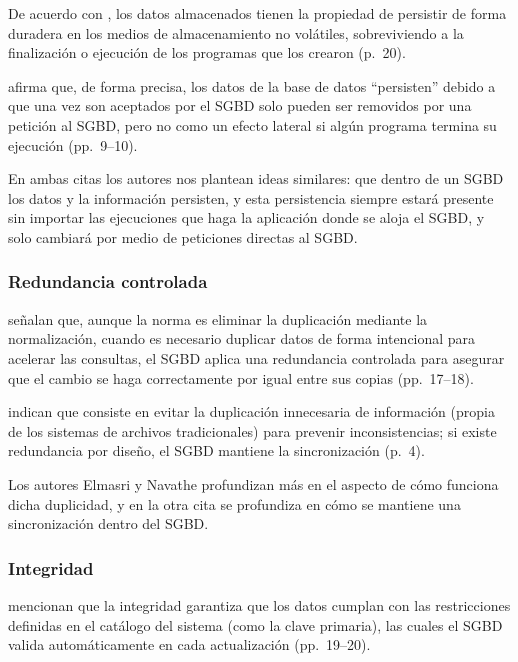 De acuerdo con \textcite{elmasri_navathe}, los datos almacenados tienen la propiedad de persistir de forma duradera en los medios de almacenamiento no volátiles, sobreviviendo a la finalización o ejecución de los programas que los crearon (p.~20).

\textcite{date_intro_bd} afirma que, de forma precisa, los datos de la base de datos \enquote{persisten} debido a que una vez son aceptados por el SGBD solo pueden ser removidos por una petición al SGBD, pero no como un efecto lateral si algún programa termina su ejecución (pp.~9--10).

En ambas citas los autores nos plantean ideas similares: que dentro de un SGBD los datos y la información persisten, y esta persistencia siempre estará presente sin importar las ejecuciones que haga la aplicación donde se aloja el SGBD, y solo cambiará por medio de peticiones directas al SGBD.

\subsubsection{Redundancia controlada}

\textcite{elmasri_navathe} señalan que, aunque la norma es eliminar la duplicación mediante la normalización, cuando es necesario duplicar datos de forma intencional para acelerar las consultas, el SGBD aplica una redundancia controlada para asegurar que el cambio se haga correctamente por igual entre sus copias (pp.~17--18).

\textcite{silberschatz_dbconcepts} indican que consiste en evitar la duplicación innecesaria de información (propia de los sistemas de archivos tradicionales) para prevenir inconsistencias; si existe redundancia por diseño, el SGBD mantiene la sincronización (p.~4).

Los autores Elmasri y Navathe profundizan más en el aspecto de cómo funciona dicha duplicidad, y en la otra cita se profundiza en cómo se mantiene una sincronización dentro del SGBD.

\subsubsection{Integridad}

\textcite{elmasri_navathe} mencionan que la integridad garantiza que los datos cumplan con las restricciones definidas en el catálogo del sistema (como la clave primaria), las cuales el SGBD valida automáticamente en cada actualización (pp.~19--20).

